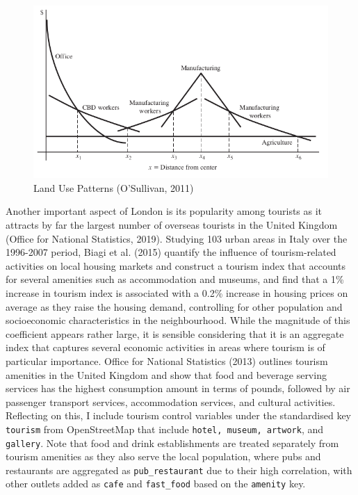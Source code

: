 \documentclass{article}
\begin{document}
\begin{figure}[H]
  \centering
  \includegraphics[width=0.8\linewidth]{images/land-use-patterns.png}
  \caption{Land Use Patterns (O'Sullivan, 2011)}
  \label{fig:landuse}
\end{figure}

Another important aspect of London is its popularity among tourists as it attracts by far the largest number of overseas tourists in the United Kingdom (Office for National Statistics, 2019). Studying 103 urban areas in Italy over the 1996-2007 period, Biagi et al. (2015) quantify the influence of tourism-related activities on local housing markets and construct a tourism index that accounts for several amenities such as accommodation and museums, and find that a 1\% increase in tourism index is associated with a 0.2\% increase in housing prices on average as they raise the housing demand, controlling for other population and socioeconomic characteristics in the neighbourhood. While the magnitude of this coefficient appears rather large, it is sensible considering that it is an aggregate index that captures several economic activities in areas where tourism is of particular importance. Office for National Statistics (2013) outlines tourism amenities in the United Kingdom and show that food and beverage serving services has the highest consumption amount in terms of pounds, followed by air passenger transport services, accommodation services, and cultural activities. Reflecting on this, I include tourism control variables under the standardised key \texttt{tourism} from OpenStreetMap that include \texttt{hotel, museum, artwork}, and \texttt{gallery}. Note that food and drink establishments are treated separately from tourism amenities as they also serve the local population, where pubs and restaurants are aggregated as \texttt{pub\_restaurant} due to their high correlation, with other outlets added as \texttt{cafe} and \texttt{fast\_food} based on the \texttt{amenity} key.
\end{document}

